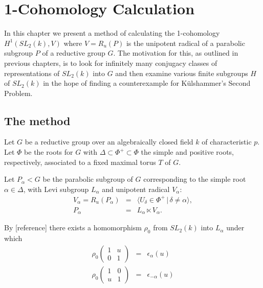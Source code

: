 
\chapter{1-Cohomology Calculation}
\label{Chapter5}

In this chapter we present a method of calculating the 1-cohomology $H^1\left( SL_2(k), V\right)$ where $V=R_u(P)$ is the unipotent radical of a parabolic subgroup $P$ of a reductive group $G$. The motivation for this, as outlined in previous chapters, is to look for infinitely many conjugacy classes of representations of $SL_2(k)$ into $G$ and then examine various finite subgroups $H$ of $SL_2(k)$ in the hope of finding a counterexample for K\"ulshammer's Second Problem.

\section{The method}

Let $G$ be a reductive group over an algebraically closed field $k$ of characteristic $p$. Let $\Phi$ be the roots for $G$ with $\Delta \subset \Phi^+ \subset \Phi$ the simple and positive roots, respectively, associated to a fixed maximal torus $T$ of $G$. 

Let $P_\alpha<G$ be the parabolic subgroup of $G$ corresponding to the simple root $\alpha\in\Delta$, with Levi subgroup $L_\alpha$ and unipotent radical $V_\alpha$:
\begin{eqnarray*}
V_\alpha=R_u(P_\alpha) &=& \langle U_\delta \in \Phi^+\, | \, \delta \neq \alpha \rangle,\\
P_\alpha &=& L_\alpha \ltimes V_\alpha.
\end{eqnarray*}

By [reference] there exists a homomorphism $\rho_0$ from $ SL_2(k)$ into $L_\alpha$ under which
\begin{eqnarray*}
\rho_0 \left(\begin{matrix} 1 &  u \\ 0 & 1 \end{matrix} \right) &=& \epsilon_\alpha(u) \\
\rho_0 \left(\begin{matrix} 1 & 0 \\ u & 1 \end{matrix} \right) &=& \epsilon_{-\alpha}(u)
\end{eqnarray*}

